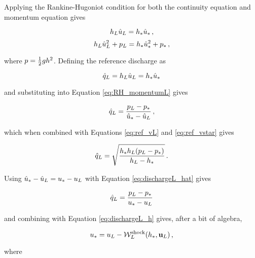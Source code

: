 Applying the Rankine-Hugoniot condition for both the continuity equation and
momentum equation gives

\begin{equation}
  h_L\hat{u}_L = h_*\hat{u}_* \,,
\end{equation}
\begin{equation}\label{eq:RH_momentumL}
  h_L\hat{u}_L^2 + p_L
    = h_*\hat{u}_*^2 + p_*
    \,,
\end{equation}

where $p = \frac{1}{2}gh^2$.
Defining the reference discharge as

\begin{equation}
  \hat{q}_L = h_L\hat{u}_L = h_*\hat{u}_*
\end{equation}

and substituting into Equation \eqref{eq:RH_momentumL} gives

\begin{equation}\label{eq:dischargeL_hat}
  \hat{q}_L = \frac{p_L - p_*}
    {\hat{u}_* - \hat{u}_L}
    \,,
\end{equation}

which when combined with Equations \eqref{eq:ref_vL} and \eqref{eq:ref_vstar}
gives

\begin{equation}\label{eq:dischargeL_h}
  \hat{q}_L = \sqrt{\frac{h_*h_L
    (p_L - p_*)}
    {h_L - h_*}}
    \,.
\end{equation}

Using $\hat{u}_* - \hat{u}_L = u_* - u_L$
with Equation \eqref{eq:dischargeL_hat} gives

\begin{equation}
  \hat{q}_L = \frac{p_L - p_*}
    {u_* - u_L}
\end{equation}

and combining with Equation \eqref{eq:dischargeL_h} gives, after a bit of
algebra,

\begin{equation}\label{eq:ustarLshock}
  u_* = u_L
    - \mathcal{W}^{\text{shock}}_L(h_*,\mathbf{u}_L)
    \,,
\end{equation}

where

